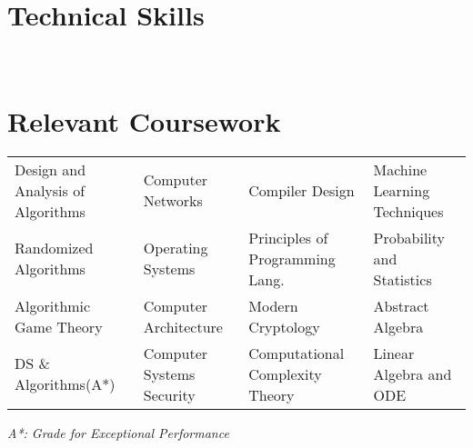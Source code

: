 \documentclass[a4paper]{norm-resume}
\begin{document}
\vspace{2mm}    %


\section{Technical Skills \hrulefill}

 \hfill {} \\
 \hfill {}

\vspace{2mm}    %


\section{Relevant Coursework \hrulefill}

\begin{table}[h!]
    \small
    \vspace{-\topsep}
    \begin{tabular}{l l l l}
        Design and Analysis of Algorithms
        & Computer Networks
        & Compiler Design
        & Machine Learning Techniques \\
        Randomized Algorithms
        & Operating Systems
        & Principles of Programming Lang.
        & Probability and Statistics \\
        Algorithmic Game Theory
        & Computer Architecture
        & Modern Cryptology
        & Abstract Algebra \\
        DS \& Algorithms(A*)
        & Computer Systems Security
        & Computational Complexity Theory
        & Linear Algebra and ODE \\
    \end{tabular}
    \vspace{-\topsep}
\end{table}
\hfill \small
\textit{A*: Grade for Exceptional Performance}

\normalsize

\vspace{-2mm}    %
\end{document}
